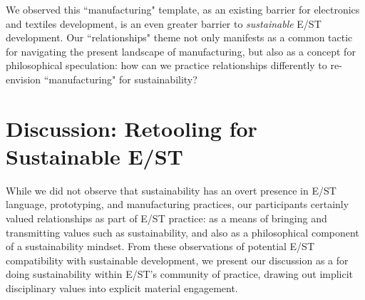 \documentclass[manuscript,review,anonymous]{acmart}
\begin{document}
We observed this ``manufacturing" template, as an existing barrier for electronics and textiles development, is an even greater barrier to \textit{sustainable} E/ST development. Our ``relationships" theme not only manifests as a common tactic for navigating the present landscape of manufacturing, but also as a concept for philosophical speculation: how can we practice relationships differently to re-envision ``manufacturing" for sustainability? 

\section{Discussion: Retooling for Sustainable E/ST}
While we did not observe that sustainability has an overt presence in E/ST language, prototyping, and manufacturing practices, our participants certainly valued relationships as part of E/ST practice: as a means of bringing and transmitting values such as sustainability, and also as a philosophical component of a sustainability mindset. From these observations of potential E/ST compatibility with sustainable development, we present our discussion as a %
 for doing sustainability within E/ST's community of practice, drawing out implicit disciplinary values into explicit material engagement. 
\end{document}
